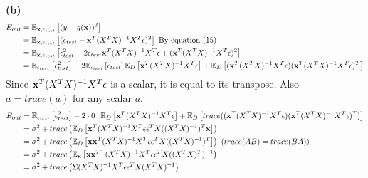 \documentclass[12pt]{article}
\newcommand{\e}[0]{\epsilon}
\begin{document}
\textbf{(b)}
\begin{align} \nonumber
    E_{out} & = \mathbb{E}_{{\bf x},\e_{test}} \left[ (y - g({\bf x}))^2\right] \\ \nonumber
    & = \mathbb{E}_{{\bf x},\e_{test}} \left[ (\e_{test} - {\bf x}^T(X^TX)^{-1}X^T{\bf \e})^2 \right] \text{ By equation (15)}\\ \nonumber
    & = \mathbb{E}_{{\bf x},\e_{test}} \left[ \e_{test}^2 -2\e_{test}{\bf x}^T(X^TX)^{-1}X^T{\bf \e} + ({\bf x}^T(X^TX)^{-1}X^T{\bf \e})^2 \right] \\ \nonumber
    & = \mathbb{E}_{\e_{test}} \left[ \e_{test}^2\right] - 2\mathbb{E}_{\e_{test}} \left[\e_{test}\right]\mathbb{E}_{D}\left[{\bf x}^T(X^TX)^{-1}X^T{\bf \e}\right] + \mathbb{E}_{D}\left[({\bf x}^T(X^TX)^{-1}X^T{\bf \e})({\bf x}^T(X^TX)^{-1}X^T{\bf \e})^T \right]
\end{align}
Since \({\bf x}^T(X^TX)^{-1}X^T{\bf \e}\) is a scalar, it is equal to its transpose. Also \(a = trace(a)\) for any scalar \(a\).
\begin{align} \nonumber
    E_{out} & = \mathbb{E}_{\e_{test}} \left[ \e_{test}^2\right] - 2\cdot0\cdot\mathbb{E}_{D}\left[{\bf x}^T(X^TX)^{-1}X^T{\bf \e}\right] + \mathbb{E}_{D}\left[trace(({\bf x}^T(X^TX)^{-1}X^T{\bf \e})({\bf x}^T(X^TX)^{-1}X^T{\bf \e})^T) \right] \\ \nonumber
    & = \sigma^2 + trace \left( \mathbb{E}_{D}\left[ {\bf x}^T(X^TX)^{-1}X^T{\bf \e}{\bf \e}^TX((X^TX)^{-1})^T{\bf x} \right] \right) \\ \nonumber
    & = \sigma^2 + trace \left(\mathbb{E}_{D}\left[ {\bf x}{\bf x}^T(X^TX)^{-1}X^T{\bf \e}{\bf \e}^TX((X^TX)^{-1})^T \right]\right) \text{ (\(trace(AB) = trace(BA)\))}\\ \nonumber
    & = \sigma^2 + trace\left(\mathbb{E}_{\bf x}\left[ {\bf x}{\bf x}^T\right](X^TX)^{-1}X^T{\bf \e}{\bf \e}^TX((X^TX)^{T})^{-1} \right) \\
    & = \sigma^2 + trace\left(\Sigma(X^TX)^{-1}X^T{\bf \e}{\bf \e}^TX(X^TX)^{-1} \right)
\end{align}
\end{document}

